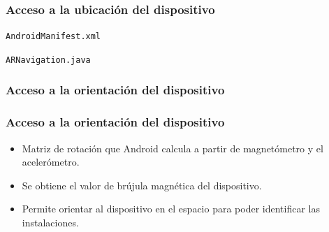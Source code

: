 \begin{frame}
\begin{columns}
\begin{column}{0.4\textwidth}
\begin{center}
			\end{center}
		\end{column}
	\end{columns}
\end{frame}

 
\begin{frame}
	\frametitle{Acceso a la ubicación del dispositivo}
	\texttt{AndroidManifest.xml}
	

	\texttt{ARNavigation.java}
	
\end{frame}


 
\begin{frame}
	\frametitle{Acceso a la orientación del dispositivo}
	
	
\end{frame}



\begin{frame}
	\frametitle{Acceso a la orientación del dispositivo}
	\begin{itemize}
		\item Matriz de rotación que Android calcula a partir de magnetómetro y el acelerómetro. 
		\item Se obtiene el valor de brújula magnética del dispositivo.
		\item Permite orientar al dispositivo en el espacio para poder identificar las instalaciones.
	\end{itemize}
	\endblock{}
	
\end{frame}


 


